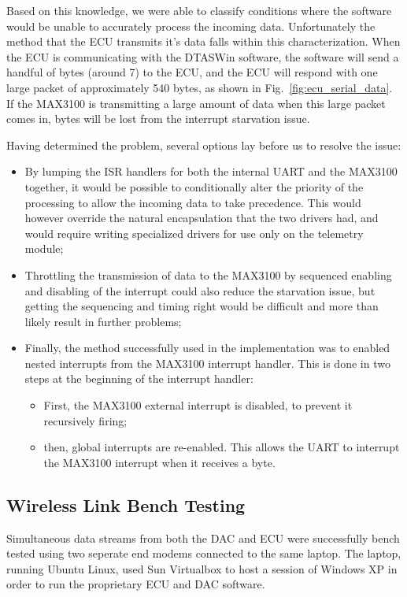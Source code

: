 Based on this knowledge, we were able to classify conditions where the software would be unable to accurately process the incoming data. Unfortunately the method that the ECU transmits it's data falls within this characterization. When the ECU is communicating with the DTASWin software, the software will send a handful of bytes (around 7) to the ECU, and the ECU will respond with one large packet of approximately 540 bytes, as shown in Fig.\ \ref{fig:ecu_serial_data}. If the MAX3100 is transmitting a large amount of data when this large packet comes in, bytes will be lost from the interrupt starvation issue.

Having determined the problem, several options lay before us to resolve the issue:
\begin{itemize}
  \item By lumping the ISR handlers for both the internal UART and the MAX3100 together, it would be possible to conditionally alter the priority of the processing to allow the incoming data to take precedence. This would however override the natural encapsulation that the two drivers had, and would require writing specialized drivers for use only on the telemetry module;
  \item Throttling the transmission of data to the MAX3100 by sequenced enabling and disabling of the interrupt could also reduce the starvation issue, but getting the sequencing and timing right would be difficult and more than likely result in further problems;
  \item Finally, the method successfully used in the implementation was to enabled nested interrupts from the MAX3100 interrupt handler. This is done in two steps at the beginning of the interrupt handler:
  \begin{itemize}
   \item First, the MAX3100 external interrupt is disabled, to prevent it recursively firing;
    \item then, global interrupts are re-enabled. This allows the UART to interrupt the MAX3100 interrupt when it receives a byte.
  \end{itemize}
\end{itemize}

\subsection{Wireless Link Bench Testing}

Simultaneous data streams from both the DAC and ECU were successfully bench tested using two seperate end modems connected to the same laptop. The laptop, running Ubuntu Linux, used Sun Virtualbox to host a session of Windows XP in order to run the proprietary ECU and DAC software.

